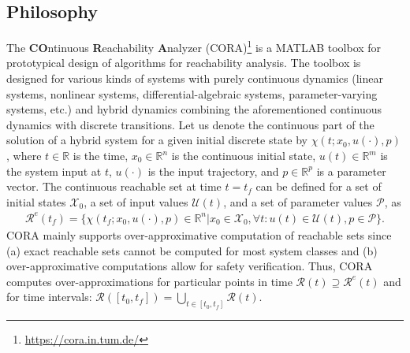 \subsection{Philosophy}

The \textbf{CO}ntinuous \textbf{R}eachability \textbf{A}nalyzer (CORA)\footnote{\url{https://cora.in.tum.de/}} is a MATLAB toolbox for prototypical design of algorithms for reachability analysis. The toolbox is designed for various kinds of systems with purely continuous dynamics (linear systems, nonlinear systems, differential-algebraic systems, parameter-varying systems, etc.) and hybrid dynamics combining the aforementioned continuous dynamics with discrete transitions.
Let us denote the continuous part of the solution of a hybrid system for a given initial discrete state by $\chi(t;x_0,u(\cdot),p)$, where $t\in\mathbb{R}$ is the time, $x_0 \in \mathbb{R}^n$ is the continuous initial state, $u(t) \in \mathbb{R}^m$ is the system input at $t$, $u(\cdot)$ is the input trajectory, and $p\in \mathbb{R}^p$ is a parameter vector. The continuous reachable set at time $t=t_f$ can be defined for a set of initial states $\mathcal{X}_0$, a set of input values $\mathcal{U}(t)$, and a set of parameter values $\mathcal{P}$, as
\begin{gather*}
  \mathcal{R}^e(t_f) = \Big\{ \chi(t_f;x_0,u(\cdot),p) \in \mathbb{R}^n \big| x_0 \in \mathcal{X}_0, \forall t: u(t)\in\mathcal{U}(t), p \in \mathcal{P} \Big\}.
\end{gather*}
CORA mainly supports over-approximative computation of reachable sets since (a) exact reachable sets cannot be computed for most system classes \cite{Lafferriere2001} and (b) over-approximative computations allow for safety verification. Thus, CORA computes over-approximations for particular points in time $\mathcal{R}(t) \supseteq \mathcal{R}^e(t)$ and for time intervals: $\mathcal{R}([t_0,t_f]) = \bigcup_{t\in [t_0,t_f]} \mathcal{R}(t)$. 

